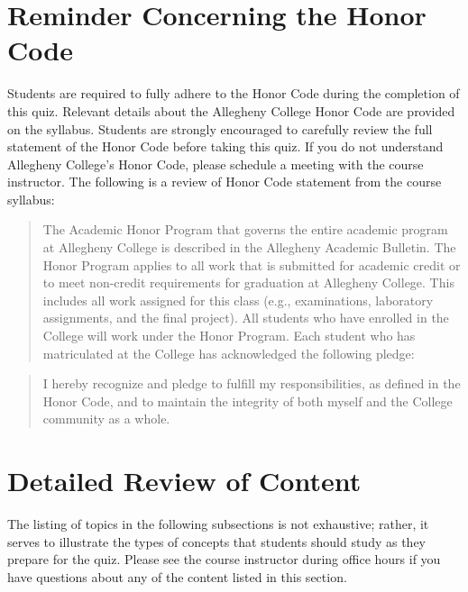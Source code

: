 \documentclass[11pt]{article}
\begin{document}
\section*{Reminder Concerning the Honor Code}

\noindent Students are required to fully adhere to the Honor Code during the
completion of this quiz. Relevant details about the Allegheny College Honor Code
are provided on the syllabus. Students are strongly encouraged to carefully
review the full statement of the Honor Code before taking this quiz. If you do
not understand Allegheny College's Honor Code, please schedule a meeting with
the course instructor. The following is a review of Honor Code statement from
the course syllabus:

\vspace*{-.1in}

\begin{quote}
The Academic Honor Program that governs the entire academic program at
Allegheny College is described in the Allegheny Academic Bulletin. The Honor
Program applies to all work that is submitted for academic credit or to meet
non-credit requirements for graduation at Allegheny College. This includes all
work assigned for this class (e.g., examinations, laboratory assignments, and
the final project). All students who have enrolled in the College will work
under the Honor Program.  Each student who has matriculated at the College has
acknowledged the following pledge:
\end{quote}

\vspace*{-.2in}

\begin{quote}
%
  I hereby recognize and pledge to fulfill my responsibilities, as defined in
  the Honor Code, and to maintain the integrity of both myself and the College
  community as a whole.
%
\end{quote}

\vspace*{-.1in}

\section*{Detailed Review of Content}

The listing of topics in the following subsections is not exhaustive; rather,
it serves to illustrate the types of concepts that students should study as
they prepare for the quiz. Please see the course instructor during office hours
if you have questions about any of the content listed in this section.
\end{document}
